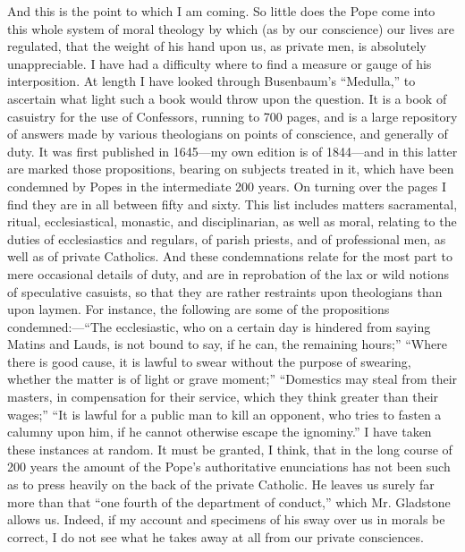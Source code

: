 And this is the point to which I am coming. So little does the Pope
come into this whole system of moral theology by which (as by our
conscience) our lives are regulated, that the weight of his hand upon
us, as private men, is absolutely unappreciable. I have had a difficulty
where to find a measure or gauge of his interposition. At length I have
looked through Busenbaum's ``Medulla,'' to ascertain what
light such a book would throw upon the question. It is a book of
casuistry for the use of Confessors, running to 700 pages, and is a
large repository of answers made by various theologians on points of
conscience, and generally of duty. It was first published in 1645—my
own edition is of 1844—and in this latter are marked those
propositions, bearing on subjects treated in it, which have been
condemned by Popes in the intermediate 200 years. On turning over the
pages I find they are in all between fifty and sixty. This list includes
matters sacramental, ritual, ecclesiastical, monastic, and
disciplinarian, as well as moral, relating to the duties of
ecclesiastics and regulars, of parish priests, and of professional men,
as well as of private Catholics. And these condemnations relate for the
most part to mere occasional details of duty, and are in reprobation of
the lax or wild notions of speculative casuists, so that they are rather
restraints upon theologians than upon laymen. For instance, the
following are some of the propositions condemned:—``The
ecclesiastic, who on a certain day is hindered from saying Matins and
Lauds, is not bound to say, if he can, the remaining hours;''
``Where there is good cause, it is lawful to swear without the
purpose of swearing, whether the matter is of light or grave
moment;'' ``Domestics may steal from their masters, in
compensation for their service, which they think greater than their
wages;'' ``It is lawful for a public man to kill an opponent,
who tries to fasten a calumny upon him, if he cannot otherwise escape
the ignominy.'' I have taken these instances at random. It must be
granted, I think, that in the long course of 200 years the amount
of the Pope's authoritative enunciations has not been such as to press
heavily on the back of the private Catholic. He leaves us surely far
more than that ``one fourth of the department of conduct,''
which Mr. Gladstone allows us. Indeed, if my account and specimens of
his sway over us in morals be correct, I do not see what he takes away
at all from our private consciences.

